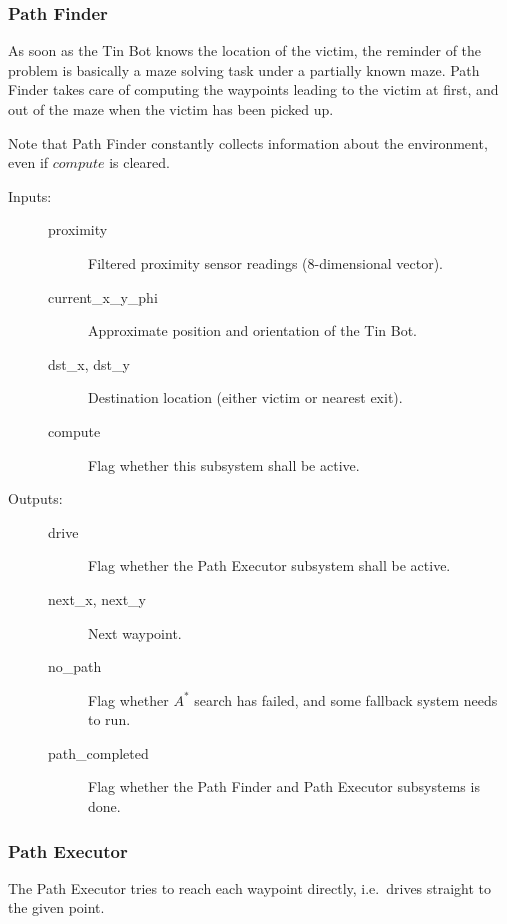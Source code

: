 \documentclass[a4paper,parskip,headheight=38pt]{scrartcl} %
\begin{document}
\subsubsection{Path Finder}
As soon as the Tin Bot knows the location of the victim, the reminder of the problem is basically a maze solving task under a partially known maze. 
Path Finder takes care of computing the waypoints leading to the victim at first, and out of the maze when the victim has been picked up. 

Note that Path Finder constantly collects information about the environment, even if $compute$ is cleared.

\begin{description}
\item[Inputs:] \hfill
    \begin{description}
    \item[proximity] Filtered proximity sensor readings (8-dimensional vector).
    \item[current\_x\_y\_phi] Approximate position and orientation of the Tin Bot.
  	\item[dst\_x, dst\_y] Destination location (either victim or nearest exit).
    \item[compute] Flag whether this subsystem shall be active.
	\end{description}
\item[Outputs:] \hfill
	\begin{description}
    \item[drive] Flag whether the Path Executor subsystem shall be active.
    \item[next\_x, next\_y] Next waypoint.
    \item[no\_path] Flag whether $A^\ast$ search has failed, and some fallback system needs to run.
    \item[path\_completed] Flag whether the Path Finder and Path Executor subsystems is done.
	\end{description}
\end{description}

\subsubsection{Path Executor}

The Path Executor tries to reach each waypoint directly, i.e.\ drives straight to the given point. 
\end{document}
